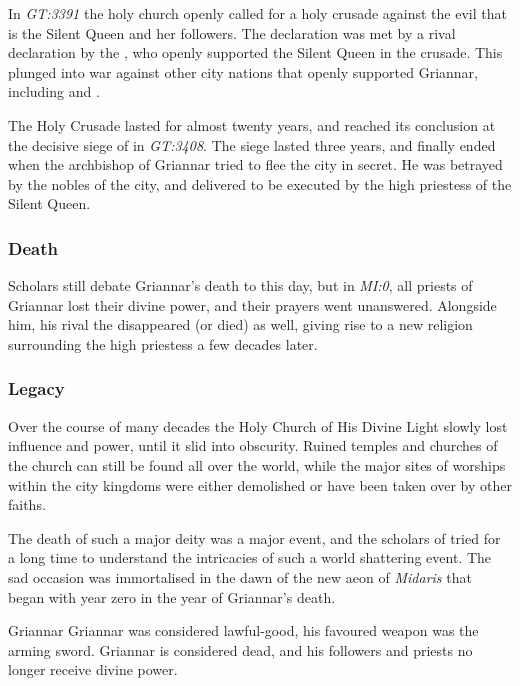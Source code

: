 In \emph{GT:3391} the holy church openly called for a holy crusade against the
evil that is the Silent Queen and her followers. The declaration was met by a
rival declaration by the , who openly supported the
Silent Queen in the crusade. This plunged  into war
against other city nations that openly supported Griannar, including
 and .

The Holy Crusade lasted for almost twenty years, and reached its conclusion
at the decisive siege of  in \emph{GT:3408}. The
siege lasted three years, and finally ended when the archbishop of Griannar
tried to flee the city in secret. He was betrayed by the nobles of the city,
and delivered to be executed by the high priestess  of the
Silent Queen.

\subsubsection{Death}

Scholars still debate Griannar's death to this day, but in \emph{MI:0}, all
priests of Griannar lost their divine power, and their prayers went
unanswered. Alongside him, his rival the  disappeared
(or died) as well, giving rise to a new religion surrounding the high priestess
 a few decades later.

\subsubsection{Legacy}

Over the course of many decades the Holy Church of His Divine Light slowly
lost influence and power, until it slid into obscurity. Ruined temples and
churches of the church can still be found all over the world, while the major
sites of worships within the city kingdoms were either demolished or have been
taken over by other faiths.

The death of such a major deity was a major event, and the scholars of
 tried for a long time to understand the
intricacies of such a world shattering event. The sad occasion was
immortalised in the dawn of the new aeon of \emph{Midaris} that began with
year zero in the year of Griannar's death.

\begin{35e}{Griannar}
  Griannar was considered lawful-good, his favoured weapon was the arming sword.
  Griannar is considered dead, and his followers and priests no longer receive
  divine power.
\end{35e}
